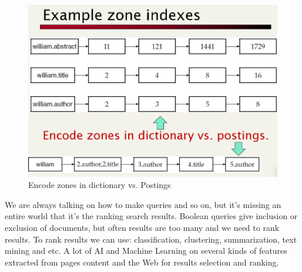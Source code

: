 \begin{figure}
    \centering
    \includegraphics[width=0.75\linewidth]{images/zonequeries.png}
    \caption{Encode zones in dictionary vs. Postings}
    \label{fig:zonequeries}
\end{figure}
We are always talking on how to make queries and so on, but it's missing an entire world that it's the ranking search results. Boolean queries give inclusion or exclusion of documents, but often results are too many and we need to rank results. To rank results we can use: classification, clustering, summarization, text mining and etc.\newline
A lot of AI and Machine Learning on several kinds of features extracted from pages content and the Web for results selection and ranking.
